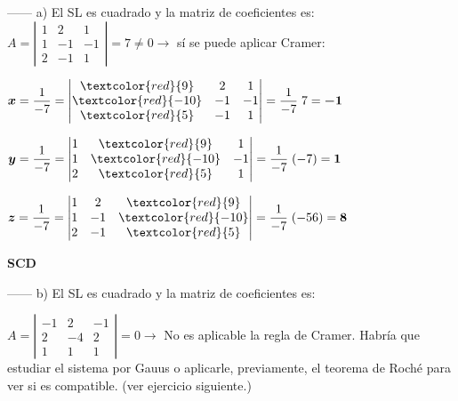 \begin{proofw}\renewcommand{\qedsymbol}{$\diamond$} 
 
 ------ a) El SL es cuadrado y la matriz de coeficientes es: $A=\left| \begin{matrix} 1&2&1\\1&-1&-1\\2&-1&1 \end{matrix} \right|= 7\neq 0 \to $ sí se puede aplicar Cramer:
 
 $\boldsymbol{x}=\dfrac 1 {-7} = \left| \begin{matrix} \textcolor{red}{9}&2&1\\\textcolor{red}{-10}&-1&-1\\\textcolor{red}{5}&-1&1 \end{matrix} \right| = \dfrac 1 {-7} \; 7 = \boldsymbol{-1}$
 
 $\boldsymbol{y}=\dfrac 1 {-7} = \left| \begin{matrix} 1&\textcolor{red}{9}&1\\1&\textcolor{red}{-10}&-1\\2&\textcolor{red}{5}&1 \end{matrix} \right| = \dfrac 1 {-7} \; (-7) = \boldsymbol{1}$
  
 $\boldsymbol{z}=\dfrac 1 {-7} = \left| \begin{matrix} 1&2&\textcolor{red}{9}\\1&-1&\textcolor{red}{-10}\\2&-1&\textcolor{red}{5} \end{matrix} \right| = \dfrac 1 {-7} \; (-56) = \boldsymbol{8}$
   
   \textbf{SCD}
   
  ------ b) El SL es cuadrado y la matriz de coeficientes es: 
 
 $A=\left| \begin{matrix} -1&2&-1\\2&-4&2\\1&1&1 \end{matrix} \right|=  0 \to $ No es aplicable la regla de Cramer. Habría que estudiar el sistema por Gauus o aplicarle, previamente, el teorema de Roché para ver si es compatible. (ver ejercicio siguiente.)

\end{proofw}
 
